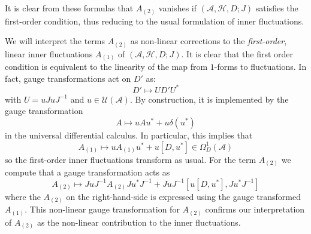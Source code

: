 \documentclass[preprint]{revtex4}
\begin{document}
It is clear from these formulas that $A_{(2)}$ vanishes if $({\mathcal{A}},{\mathcal{H}},D;J)$ satisfies the first-order condition, thus reducing to the usual formulation of inner fluctuations.

We will interpret the terms $A_{(2)}$ as non-linear corrections to the {\em first-order}, linear inner fluctuations $A_{(1)}$ of $({\mathcal{A}},{\mathcal{H}},D;J)$. It is clear that the first order condition is equivalent to the linearity of the map from $1$-forms to fluctuations.
In fact, gauge transformations act on $D'$ as:
$$
D'  \mapsto U D'  U^*
$$
with $U = u JuJ^{-1}$ and $u \in {\mathcal{U}}({\mathcal{A}})$. By construction, it is implemented by the gauge transformation
$$
A \mapsto u A u^* + u \delta(u^*)
$$
in the universal differential calculus. In particular, this implies that
$$
A_{(1)} \mapsto u A_{(1)} u^* + u [D,u^*] \in \Omega^1_D({\mathcal{A}})
$$
so the first-order inner fluctuations transform as usual. For the term $A_{(2)}$ we compute that a gauge transformation acts as
$$
A_{(2)} \mapsto JuJ^{-1} A_{(2)} J u^* J^{-1} + JuJ^{-1} [u[D,u^*],Ju^* J^{-1}]
$$
where the $A_{(2)}$ on the right-hand-side is expressed using the gauge transformed $A_{(1)}$. This non-linear gauge transformation for $A_{(2)}$ confirms our interpretation of $A_{(2)}$ as the non-linear contribution to the inner fluctuations.
\end{document}
